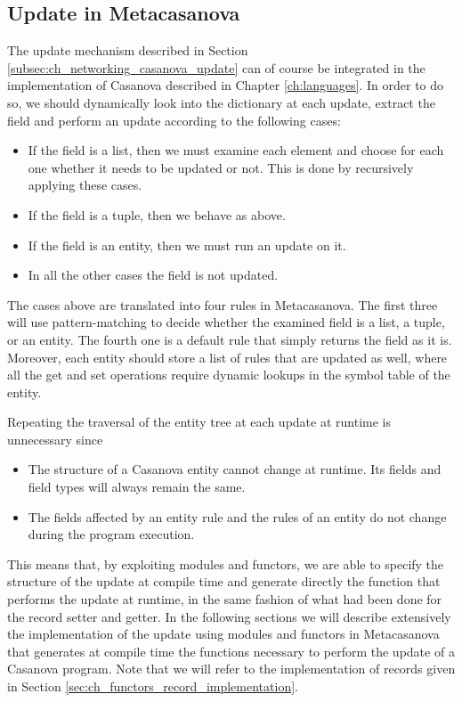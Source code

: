 \subsection{Update in Metacasanova}
\label{subsec:ch_networking_update_metacasanova}
The update mechanism described in Section \ref{subsec:ch_networking_casanova_update} can of course be integrated in the implementation of Casanova described in Chapter \ref{ch:languages}. In order to do so, we should dynamically look into the dictionary at each update, extract the field and perform an update according to the following cases:

\begin{itemize}[noitemsep]
	\item If the field is a list, then we must examine each element and choose for each one whether it needs to be updated or not. This is done by recursively applying these cases.
	\item If the field is a tuple, then we behave as above.
	\item If the field is an entity, then we must run an update on it.
	\item In all the other cases the field is not updated.
\end{itemize}

\noindent
The cases above are translated into four rules in Metacasanova. The first three will use pattern-matching to decide whether the examined field is a list, a tuple, or an entity. The fourth one is a default rule that simply returns the field as it is. Moreover, each entity should store a list of rules that are updated as well, where all the get and set operations require dynamic lookups in the symbol table of the entity.

Repeating the traversal of the entity tree at each update at runtime is unnecessary since

\begin{itemize}[noitemsep]
	\item The structure of a Casanova entity cannot change at runtime. Its fields and field types will always remain the same.
	\item The fields affected by an entity rule and the rules of an entity do not change during the program execution.
\end{itemize}

\noindent
This means that, by exploiting modules and functors, we are able to specify the structure of the update at compile time and generate directly the function that performs the update at runtime, in the same fashion of what had been done for the record setter and getter. In the following sections we will describe extensively the implementation of the update using modules and functors in Metacasanova that generates at compile time the functions necessary to perform the update of a Casanova program. Note that we will refer to the implementation of records given in Section \ref{sec:ch_functors_record_implementation}.

